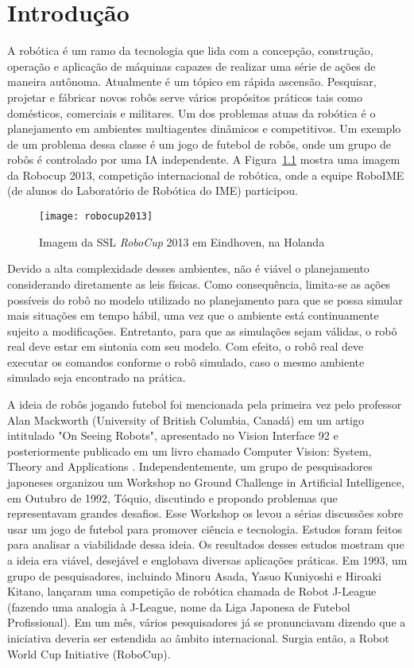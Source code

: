 \chapter{Introdução}

A robótica é um ramo da tecnologia que lida com a concepção, construção,
operação e aplicação de máquinas capazes de realizar uma série de ações de
maneira autônoma.  Atualmente é um tópico em rápida ascensão.  Pesquisar,
projetar e fábricar novos robôs serve vários propósitos práticos tais como
domésticos, comerciais e militares.  Um dos problemas atuas da robótica é o
planejamento em ambientes multiagentes dinâmicos e competitivos.  Um exemplo de
um problema dessa classe é um jogo de futebol de robôs, onde um grupo de robôs é
controlado por uma IA independente.
A Figura~\ref{fig:robocup2013} mostra uma imagem da Robocup 2013, competição
internacional de robótica, onde a equipe RoboIME (de alunos do Laboratório de
Robótica do IME) participou.

\begin{figure}[h]
  \centering
  \texttt{[image: robocup2013]}
  \caption{Imagem da SSL \textit{RoboCup} 2013 em Eindhoven, na Holanda}\label{fig:robocup2013}
\end{figure}

Devido a alta complexidade desses ambientes, não é viável o planejamento
considerando diretamente as leis físicas. Como consequência, limita-se as ações
possíveis do robô no modelo utilizado no planejamento para que se possa simular
mais situações em tempo hábil, uma vez que o ambiente está continuamente sujeito
a modificações. Entretanto, para que as simulações sejam válidas, o robô real
deve estar em sintonia com seu modelo. Com efeito, o robô real deve executar os
comandos conforme o robô simulado, caso o mesmo ambiente simulado seja
encontrado na prática.

A ideia de robôs jogando futebol foi mencionada pela primeira vez pelo professor
Alan Mackworth (University of British Columbia, Canadá) em um artigo intitulado
"On Seeing Robots", apresentado no Vision Interface 92 e posteriormente
publicado em um livro chamado Computer Vision: System, Theory and Applications
\cite{basu1993computer}.  Independentemente, um grupo de pesquisadores japoneses
organizou um Workshop no Ground Challenge in Artificial Intelligence, em Outubro
de 1992, Tóquio, discutindo e propondo problemas que representavam grandes
desafios.
Esse Workshop os levou a sérias discussões sobre usar um jogo de futebol para
promover ciência e tecnologia. Estudos foram feitos para analisar a viabilidade
dessa ideia. Os resultados desses estudos mostram que a ideia era viável,
desejável e englobava diversas aplicações práticas. Em 1993, um grupo de
pesquisadores, incluindo Minoru Asada, Yasuo Kuniyoshi e Hiroaki Kitano,
lançaram uma competição de robótica chamada de Robot J-League (fazendo uma
analogia à J-League, nome da Liga Japonesa de Futebol Profissional). Em um mês,
vários pesquisadores já se pronunciavam dizendo que a iniciativa deveria ser
estendida ao âmbito internacional. Surgia então, a Robot World Cup Initiative
(RoboCup).

